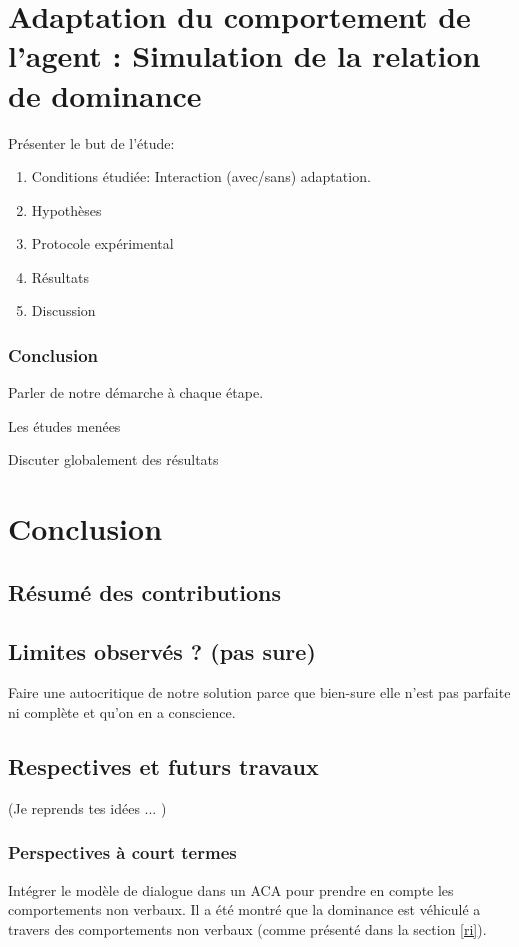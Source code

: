 \documentclass [french]{article}
\begin{document}
	\section{Adaptation du comportement de l'agent : Simulation de la relation de dominance}		
		
		Présenter le but de l'étude:
		
		\begin{enumerate}
			\item Conditions étudiée: Interaction (avec/sans) adaptation.
			\item Hypothèses
			\item Protocole expérimental
			\item Résultats
			\item Discussion
		\end{enumerate}
		
	\subsubsection{Conclusion}
		Parler de notre démarche à chaque étape.
		
		Les études menées
		
		Discuter globalement des résultats
	
	\section{Conclusion}
		\subsection{Résumé des contributions}
		
		\subsection{Limites observés ? (pas sure)}
			Faire une autocritique de notre solution parce que bien-sure elle n'est pas parfaite ni complète et qu'on en a conscience. 
		
		\subsection{Respectives et futurs travaux}
			(Je reprends tes idées ... )
			\subsubsection{Perspectives à court termes}
				Intégrer le modèle de dialogue dans un ACA pour prendre en compte les comportements non verbaux. Il a été montré que la dominance est véhiculé a travers des comportements non verbaux (comme présenté dans la section \ref{ri}).
			
\end{document}
